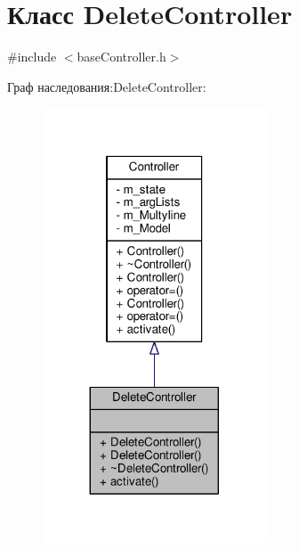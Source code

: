 \hypertarget{class_delete_controller}{\section{Класс Delete\-Controller}
\label{class_delete_controller}
}


{\ttfamily \#include $<$base\-Controller.\-h$>$}



Граф наследования\-:Delete\-Controller\-:
\nopagebreak
\begin{figure}[H]
\begin{center}
\leavevmode
\includegraphics[width=188pt]{class_delete_controller__inherit__graph}
\end{center}
\end{figure}


